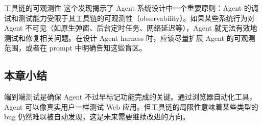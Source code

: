 \begin{knowledgebox}{工具链的可观测性}
这个发现揭示了 Agent 系统设计中一个重要原则：Agent 的调试和测试能力受限于其工具链的可观测性（observability）。如果某些系统行为对 Agent 不可见（如原生弹窗、后台定时任务、网络延迟等），Agent 就无法有效地测试和修复相关问题。在设计 Agent harness 时，应该尽量扩展 Agent 的可观测范围，或者在 prompt 中明确告知这些盲区。
\end{knowledgebox}

\subsection{本章小结}

端到端测试是确保 Agent 不过早标记功能完成的关键。通过浏览器自动化工具，Agent 可以像真实用户一样测试 Web 应用。但工具链的局限性意味着某些类型的 bug 仍然难以被自动发现，这是未来需要继续改进的方向。


